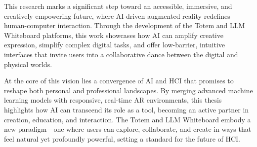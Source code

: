 


This research marks a significant step toward an accessible, immersive, and creatively empowering future, where AI-driven augmented reality redefines human-computer interaction.
Through the development of the Totem and LLM Whiteboard platforms, this work showcases how AI can amplify creative expression, simplify complex digital tasks, and offer low-barrier, intuitive interfaces that invite users into a collaborative dance between the digital and physical worlds.

At the core of this vision lies a convergence of AI and HCI that promises to reshape both personal and professional landscapes.
By merging advanced machine learning models with responsive, real-time AR environments, this thesis highlights how AI can transcend its role as a tool, becoming an active partner in creation, education, and interaction.
The Totem and LLM Whiteboard embody a new paradigm—one where users can explore, collaborate, and create in ways that feel natural yet profoundly powerful, setting a standard for the future of HCI.


